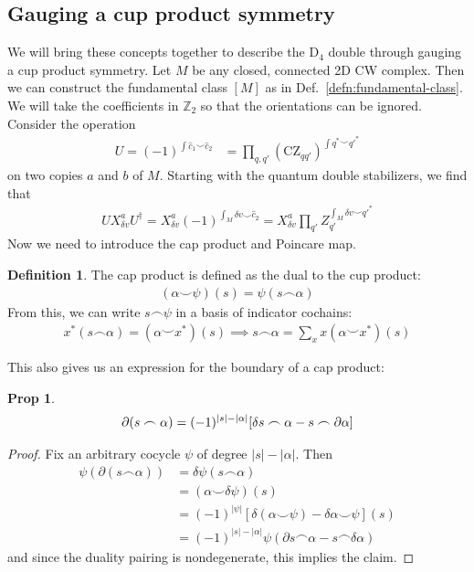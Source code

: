 \documentclass{article}
\theoremstyle{definition}
\newtheorem{defn}{Definition}
\theoremstyle{definition}
\newtheorem{prop}{Prop}
\newcommand{\Z}{\mathbb Z}
\newcommand{\D}{\mathrm{D}}
\newcommand{\CZ}{\mathrm{CZ}}
\begin{document}
\subsection{Gauging a cup product symmetry}
We will bring these concepts together to describe the $\D_4$ double through
gauging a cup product symmetry. Let $M$ be any closed,
connected 2D CW complex. Then we can construct the fundamental class $[M]$ as in
Def.~\ref{defn:fundamental-class}. We will take the coefficients in $\Z_2$ so
that the orientations can be ignored. Consider the operation
\begin{align}
  U = (-1)^{\int \hat c_1 \smile \hat c_2} &= \prod_{q, q'}(\CZ_{qq'})^{\int q^* \smile q'^*}
\end{align}
on two copies $a$ and $b$ of $M$.
Starting with the quantum double
stabilizers, we find that
\begin{align} \label{eq:stabilizer-transformation-cup-product-symmetry}
  UX_{\delta v}^aU^\dagger = X_{\delta v}^a(-1)^{\int_M \delta v \smile \hat c_2} = X_{\delta v}^a \prod_{q'}Z_{q'}^{\int_M \delta v \smile q'^*} 
\end{align}
Now we need to introduce the cap product and Poincare map.
\begin{defn}
The cap product is
defined as the dual to the cup product:
\begin{align}
  (\alpha \smile \psi)(s) = \psi(s \frown \alpha)
\end{align}
From this, we can write $s \frown \psi$ in a basis of indicator cochains:
\begin{align}
  x^*(s \frown \alpha) = (\alpha \smile x^*)(s) \implies s\frown \alpha = \sum_{x}x (\alpha\smile x^*)(s)
\end{align}
\end{defn}
This also gives us an expression for the boundary of a cap product:
\begin{prop}\label{prop:cap-product-boundary-formula}
\begin{align}
  \partial (s \frown \alpha) = (-1)^{|s| - |\alpha|}\qty[\delta s \frown \alpha - s \frown \partial \alpha]
\end{align}
\end{prop}
\begin{proof}
  Fix an arbitrary cocycle $\psi$ of degree $|s|- |\alpha|$. Then
\begin{align}
  \psi(\partial (s \frown \alpha)) &= \delta \psi(s \frown \alpha)\\
                                   &= (\alpha \smile \delta \psi)(s) \\
  &= (-1)^{|\psi|}[\delta(\alpha \smile \psi) - \delta \alpha \smile \psi](s) \\
  &= (-1)^{|s| - |\alpha|}\psi(\partial s\frown \alpha - s \frown \delta \alpha)
\end{align}
and since the duality pairing is nondegenerate, this implies the claim.
\end{proof}
\end{document}
